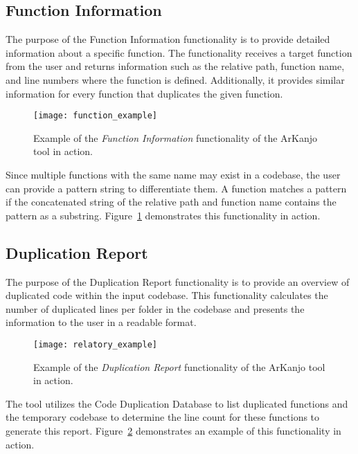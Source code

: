 \subsection{Function Information}
\label{subsec:functioncommand}

The purpose of the Function Information functionality is to provide detailed information about a specific function. The functionality receives a target function from the user and returns information such as the relative path, function name, and line numbers where the function is defined. Additionally, it provides similar information for every function that duplicates the given function.

\begin{figure}[ht]
\texttt{[image: function\_example]}
\caption{Example of the \textit{Function Information} functionality of the ArKanjo tool in action.}
\label{fig:function_ex}
\end{figure}

Since multiple functions with the same name may exist in a codebase, the user can provide a pattern string to differentiate them. A function matches a pattern if the concatenated string of the relative path and function name contains the pattern as a substring. Figure~\ref{fig:function_ex} demonstrates this functionality in action.

\subsection{Duplication Report}

The purpose of the Duplication Report functionality is to provide an overview of duplicated code within the input codebase. This functionality calculates the number of duplicated lines per folder in the codebase and presents the information to the user in a readable format. 

\begin{figure}[ht]
\texttt{[image: relatory\_example]}
\caption{Example of the \textit{Duplication Report} functionality of the ArKanjo tool in action.}
\label{fig:relatory_ex}
\end{figure}

The tool utilizes the Code Duplication Database to list duplicated functions and the temporary codebase to determine the line count for these functions to generate this report. Figure~\ref{fig:relatory_ex} demonstrates an example of this functionality in action.



